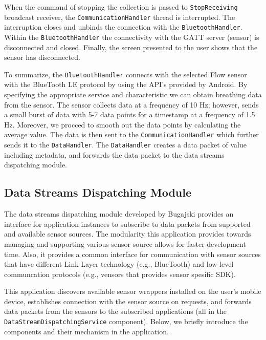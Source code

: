 When the command of stopping the collection is passed to \verb|StopReceiving| broadcast receiver, the \verb|CommunicationHandler| thread is interrupted. The interruption closes and unbinds the connection with the \verb|BluetoothHandler|. Within the \verb|BluetoothHandler| the connectivity with the GATT server (sensor) is disconnected and closed. Finally, the screen presented to the user shows that the sensor has disconnected.

To summarize, the \verb|BluetoothHandler| connects with the selected Flow sensor with the BlueTooth LE protocol by using the API's provided by Android. By specifying the appropriate service and characteristic we can obtain breathing data from the sensor. The sensor collects data at a frequency of 10 Hz; however, sends a small burst of data with 5-7 data points for a timestamp at a frequency of 1.5 Hz. Moreover, we procced to smooth out the data points by calculating the average value. The data is then sent to the \verb|CommunicationHandler| which further sends it to the \verb|DataHandler|. The \verb|DataHandler| creates a data packet of value including metadata, and forwards the data packet to the data streams dispatching module.  


\subsection{Data Streams Dispatching Module}\label{imp:dsdm}
The data streams dispatching module developed by Bugajski provides an interface for application instances to subscribe to data packets from supported and available sensor sources. The modularity this application provides towards managing and supporting various sensor source allows for faster development time. Also, it provides a common interface for communication with sensor sources that have different Link Layer technology (e.g., BlueTooth) and low-level communcation protocols (e.g., vensors that provides sensor spesific SDK). 

This application discovers available sensor wrappers installed on the user's mobile device, establishes connection with the sensor source on requests, and forwards data packets from the sensors to the subscribed applications (all in the \verb|DataStreamDispatchingService| component). Below, we briefly introduce the components and their mechanism in the application.

